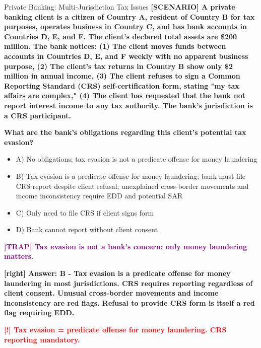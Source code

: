\documentclass[11pt,a4paper]{beamer}
\newcommand{\redflag}[1]{\textcolor{red}{\textbf{[!] #1}}}
\newcommand{\trap}[1]{\textcolor{purple}{\textbf{[TRAP] #1}}}
\newcommand{\correct}[1]{\textcolor{green!50!black}{\textbf{[right] #1}}}
\newcommand{\scenario}[1]{\textcolor{blue!70!black}{\textbf{[SCENARIO] #1}}}
\begin{document}
	
	\begin{frame}{Private Banking: Multi-Jurisdiction Tax Issues}
		\tiny
		\scenario{A private banking client is a citizen of Country A, resident of Country B for tax purposes, operates business in Country C, and has bank accounts in Countries D, E, and F. The client's declared total assets are \$200 million. The bank notices: (1) The client moves funds between accounts in Countries D, E, and F weekly with no apparent business purpose, (2) The client's tax returns in Country B show only \$2 million in annual income, (3) The client refuses to sign a Common Reporting Standard (CRS) self-certification form, stating "my tax affairs are complex," (4) The client has requested that the bank not report interest income to any tax authority. The bank's jurisdiction is a CRS participant.}
		
		\vspace{0.02cm}
		\textbf{What are the bank's obligations regarding this client's potential tax evasion?}
		\vspace{0.02cm}
		
		\begin{itemize}
			\item A) No obligations; tax evasion is not a predicate offense for money laundering
			\item B) Tax evasion is a predicate offense for money laundering; bank must file CRS report despite client refusal; unexplained cross-border movements and income inconsistency require EDD and potential SAR
			\item C) Only need to file CRS if client signs form
			\item D) Bank cannot report without client consent
		\end{itemize}
		
		\vspace{0.02cm}
		\trap{Tax evasion is not a bank's concern; only money laundering matters.}
		
		\vspace{0.02cm}
		\correct{Answer: B - Tax evasion is a predicate offense for money laundering in most jurisdictions. CRS requires reporting regardless of client consent. Unusual cross-border movements and income inconsistency are red flags. Refusal to provide CRS form is itself a red flag requiring EDD.}
		
		\vspace{0.02cm}
		\redflag{Tax evasion = predicate offense for money laundering. CRS reporting mandatory.}
	\end{frame}
	
\end{document}
